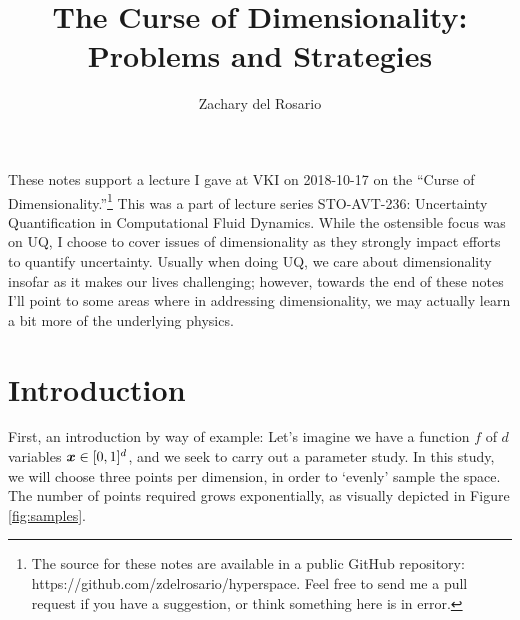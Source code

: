 \documentclass{article}
\title{The Curse of Dimensionality: Problems and Strategies}
\author{Zachary del Rosario}
\begin{document}
\maketitle

These notes support a lecture I gave at VKI on 2018-10-17 on the ``Curse of
Dimensionality.''\footnote{The source for these notes are available in a public
  GitHub repository: https://github.com/zdelrosario/hyperspace. Feel free to
  send me a pull request if you have a suggestion, or think something here is in
  error.} This was a part of lecture series STO-AVT-236: Uncertainty
Quantification in Computational Fluid Dynamics. While the ostensible focus was
on UQ, I choose to cover issues of dimensionality as they strongly impact
efforts to quantify uncertainty. Usually when doing UQ, we care about
dimensionality insofar as it makes our lives challenging; however, towards the
end of these notes I'll point to some areas where in addressing dimensionality,
we may actually learn a bit more of the underlying physics.

\section{Introduction}
First, an introduction by way of example: Let's imagine we have a function $f$
of $d$ variables $\boldsymbol{x}\in[0,1]^d$, and we seek to carry out a parameter study. In
this study, we will choose three points per dimension, in order to `evenly'
sample the space. The number of points required grows exponentially,
as visually depicted in Figure \ref{fig:samples}.
\end{document}
